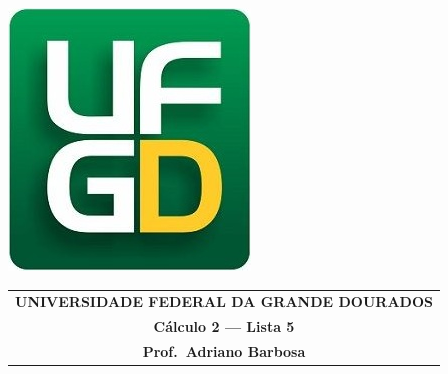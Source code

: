\documentclass[a4paper,5pt]{amsbook}
\begin{document}
\thispagestyle{empty}
\pagestyle{empty}
\begin{minipage}[h]{0.14\textwidth}
	\includegraphics[scale=0.24]{../../ufgd.png}
\end{minipage}
\begin{minipage}[h]{\textwidth}
\begin{tabular}{c}
{{\bf UNIVERSIDADE FEDERAL DA GRANDE DOURADOS}}\\
{{\bf C\'{a}lculo 2 --- Lista 5}}\\
{{\bf Prof.\ Adriano Barbosa}}\\
\end{tabular}
\vspace{-0.45cm}
%
\end{minipage}

\end{document}
